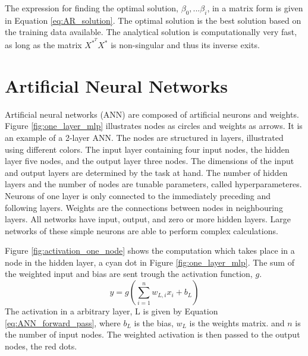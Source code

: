 \documentclass{article}
\begin{document}
The expression for finding the optimal solution, $\beta_0,...\beta_i$, in a matrix form is given in Equation \eqref{eq:AR_solution}. The optimal solution is the best solution based on the training data available. The analytical solution is computationally very fast, as long as the matrix $X^*^TX^*$ is non-singular and thus its inverse exits.

\section{Artificial Neural Networks} \label{sec:artificial neural networks}

Artificial neural networks (ANN) are composed of artificial neurons and weights. Figure \ref{fig:one_layer_mlp} illustrates nodes as circles and weights as arrows. It is an example of a 2-layer ANN. The nodes are structured in layers, illustrated using different colors. The input layer containing four input nodes, the hidden layer five nodes, and the output layer three nodes. The dimensions of the input and output layers are determined by the task at hand. The number of hidden layers and the number of nodes are tunable parameters, called hyperparameteres. Neurons of one layer is only connected to the immediately preceding and following layers. Weights are the connections between nodes in neighbouring layers. All networks have input, output, and zero or more hidden layers. Large networks of these simple neurons are able to perform complex calculations. 

Figure \ref{fig:activation_one_node} shows the computation which takes place in a node in the hidden layer, a cyan dot in Figure \ref{fig:one_layer_mlp}. The sum of the weighted input and bias are sent trough the activation function, $g$. 
\begin{equation} \label{eq:ANN_forward_pass}
    y = g(\sum_{i=1}^n w_{L, i} x_i + b_L)
\end{equation}
The activation in a arbitrary layer, L is given by Equation \eqref{eq:ANN_forward_pass}, where $b_L$ is the bias, $w_L$ is the weights matrix. and $n$ is the number of input nodes. The weighted activation is then passed to the output nodes, the red dots. 
\end{document}
